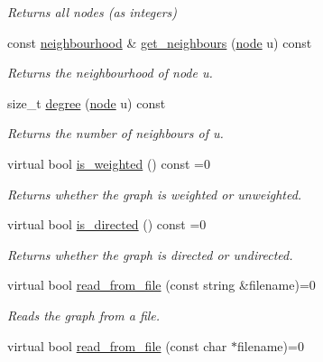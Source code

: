\begin{DoxyCompactItemize}
\begin{DoxyCompactList}\small\item\em Returns all nodes (as integers) \end{DoxyCompactList}\item 
const \hyperlink{namespacelgraph_1_1utils_a0f2ef47028a466d26841709e705390ac}{neighbourhood} \& \hyperlink{classlgraph_1_1utils_1_1xxgraph_a2c5332c4663c2d52828893f095a68202}{get\+\_\+neighbours} (\hyperlink{namespacelgraph_1_1utils_a7bd66ede3805ef121bc2835bd48de0cf}{node} u) const 
\begin{DoxyCompactList}\small\item\em Returns the neighbourhood of node u. \end{DoxyCompactList}\item 
size\+\_\+t \hyperlink{classlgraph_1_1utils_1_1xxgraph_af588aa4c68004a31aa143024cdb6dcc9}{degree} (\hyperlink{namespacelgraph_1_1utils_a7bd66ede3805ef121bc2835bd48de0cf}{node} u) const 
\begin{DoxyCompactList}\small\item\em Returns the number of neighbours of u. \end{DoxyCompactList}\item 
virtual bool \hyperlink{classlgraph_1_1utils_1_1xxgraph_a470b3fa2d6e37914d383de7d44f649e0}{is\+\_\+weighted} () const =0
\begin{DoxyCompactList}\small\item\em Returns whether the graph is weighted or unweighted. \end{DoxyCompactList}\item 
virtual bool \hyperlink{classlgraph_1_1utils_1_1xxgraph_a154376b6e55c4654622eb17ce738b5bb}{is\+\_\+directed} () const =0
\begin{DoxyCompactList}\small\item\em Returns whether the graph is directed or undirected. \end{DoxyCompactList}\item 
virtual bool \hyperlink{classlgraph_1_1utils_1_1xxgraph_a36206a20eb3f319bc01f1c07d16e0456}{read\+\_\+from\+\_\+file} (const string \&filename)=0\hypertarget{classlgraph_1_1utils_1_1xxgraph_a36206a20eb3f319bc01f1c07d16e0456}{}\label{classlgraph_1_1utils_1_1xxgraph_a36206a20eb3f319bc01f1c07d16e0456}

\begin{DoxyCompactList}\small\item\em Reads the graph from a file. \end{DoxyCompactList}\item 
virtual bool \hyperlink{classlgraph_1_1utils_1_1xxgraph_ac626dc5b5bac561bd103d9a346312b87}{read\+\_\+from\+\_\+file} (const char $\ast$filename)=0\hypertarget{classlgraph_1_1utils_1_1xxgraph_ac626dc5b5bac561bd103d9a346312b87}{}\label{classlgraph_1_1utils_1_1xxgraph_ac626dc5b5bac561bd103d9a346312b87}


\end{DoxyCompactItemize}
